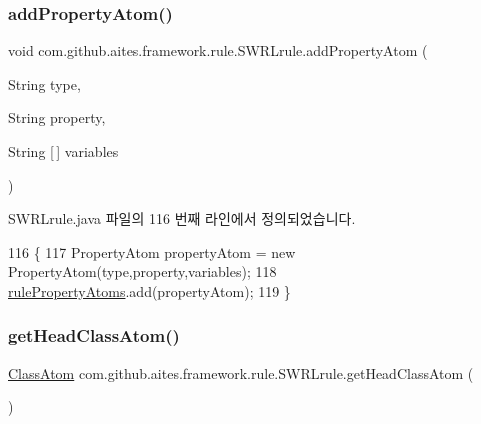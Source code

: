 \subsubsection{\texorpdfstring{add\+Property\+Atom()}{addPropertyAtom()}}
{\footnotesize\ttfamily void com.\+github.\+aites.\+framework.\+rule.\+S\+W\+R\+Lrule.\+add\+Property\+Atom (\begin{DoxyParamCaption}\item[{String}]{type,  }\item[{String}]{property,  }\item[{String \mbox{[}$\,$\mbox{]}}]{variables }\end{DoxyParamCaption})}



S\+W\+R\+Lrule.\+java 파일의 116 번째 라인에서 정의되었습니다.


\begin{DoxyCode}
116                                                                                  \{
117         PropertyAtom propertyAtom = \textcolor{keyword}{new} PropertyAtom(type,property,variables);
118         \mbox{\hyperlink{classcom_1_1github_1_1aites_1_1framework_1_1rule_1_1_s_w_r_lrule_a4236a432610492bb79e3822eec52fea3}{rulePropertyAtoms}}.add(propertyAtom);
119     \}
\end{DoxyCode}
\mbox{\label{classcom_1_1github_1_1aites_1_1framework_1_1rule_1_1_s_w_r_lrule_ac1db206d60cb8bea838593d3e0dcfd02}} 
\subsubsection{\texorpdfstring{get\+Head\+Class\+Atom()}{getHeadClassAtom()}}
{\footnotesize\ttfamily \mbox{\hyperlink{classcom_1_1github_1_1aites_1_1framework_1_1rule_1_1_s_w_r_lrule_1_1_class_atom}{Class\+Atom}} com.\+github.\+aites.\+framework.\+rule.\+S\+W\+R\+Lrule.\+get\+Head\+Class\+Atom (\begin{DoxyParamCaption}{ }\end{DoxyParamCaption})}



